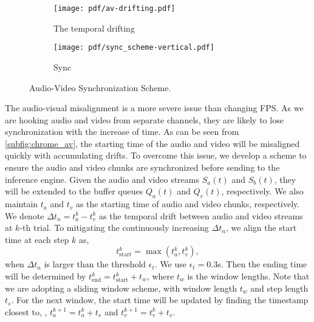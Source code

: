 \begin{figure}[t]
    \centering
    \begin{minipage}{0.8\linewidth}
        \begin{subfigure}{0.68\linewidth}
            \centering
            \texttt{[image: pdf/av-drifting.pdf]}
            \caption{The temporal drifting}
            \label{fig:temporal_drifting}
        \end{subfigure}
        \begin{subfigure}{0.3\linewidth}
            \texttt{[image: pdf/sync\_scheme-vertical.pdf]} %
            \caption{Sync}
            \label{subfig:sync_scheme}
        \end{subfigure}
    \end{minipage}
    \caption{Audio-Video Synchronization Scheme.}
    \label{fig: res_dis}
\end{figure}
The audio-visual misalignment is a more severe issue than changing FPS. 
As we are hooking audio and video from separate channels, they are likely to lose synchronization with the increase of time. As can be seen from \fig\ref{subfig:chrome_av}, the starting time of the audio and video will be misaligned quickly with accumulating drifts. To overcome this issue, we develop a scheme to ensure the audio and video chunks are synchronized before sending to the inference engine. Given the audio and video streams $S_a(t)$ and $S_b(t)$, they will be extended to the buffer queues $Q_a(t)$ and $Q_v(t)$, respectively. We also maintain $t_a$ and $t_v$ as the starting time of audio and video chunks, respectively. We denote $\Delta t_n = t_a^{k} - t_v^{k}$ as the temporal drift between audio and video streams at $k$-th trial. To mitigating the continuously increasing $\Delta t_n$, we align the start time at each step $k$ as, 
\begin{equation}
    t_{\text{start}}^{k} = \max(t_{a}^{k}, t_{v}^{k}),
\end{equation}
when $\Delta t_n$ is larger than the threshold $\epsilon_t$. We use $\epsilon_t=0.3$s. Then the ending time will be determined by $t_{\text{end}}^{k} = t_{\text{start}}^{k} + t_w$,
where $t_w$ is the window lengths. Note that we are adopting a sliding window scheme, with window length $t_w$ and step length $t_s$. For the next window, the start time will be updated by finding the timestamp closest to, \ie, $t_{a}^{k+1} = t_{a}^{k} + t_s$ and $t_{v}^{k+1} = t_{v}^{k} + t_s$.
